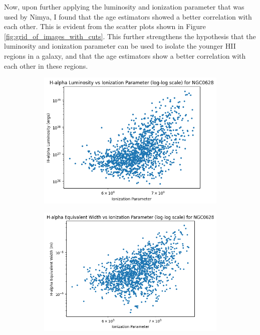 \documentclass[12pt]{report}
\begin{document}
Now, upon further applying the luminosity and ionization parameter that was used by Nimya, I found that the age estimators showed a better correlation with each other. This is evident from the scatter plots shown in Figure \ref{fig:grid_of_images_with_cuts}. This further strengthens the hypothesis that the luminosity and ionization parameter can be used to isolate the younger HII regions in a galaxy, and that the age estimators show a better correlation with each other in these regions.


\begin{figure}[htbp]
    \centering
    
    \caption*{NGC0628}
    \begin{subfigure}{0.3\textwidth}
        \centering
        \includegraphics[width=\linewidth]{image4.png}
        \label{fig:image4}
    \end{subfigure}
    \hfill
    \begin{subfigure}{0.3\textwidth}
        \centering
        \includegraphics[width=\linewidth]{image5.png}

\end{subfigure}
\end{figure}
\end{document}

